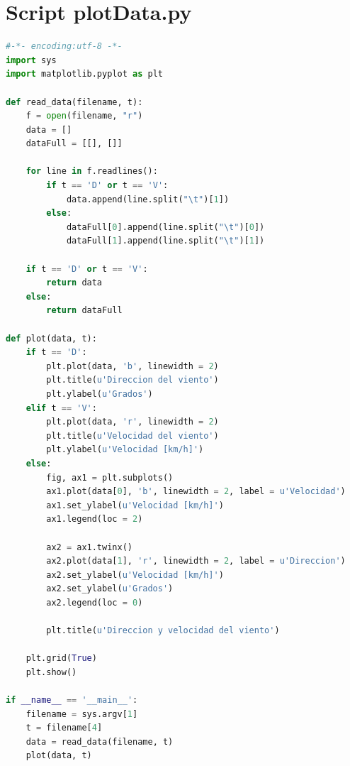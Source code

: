 \documentclass[a4paper, 11pt]{article}
\begin{document}
\section{Script plotData.py}
\label{app:script5}
\begin{lstlisting}[basicstyle=\small, language = Python]
#-*- encoding:utf-8 -*-
import sys
import matplotlib.pyplot as plt

def read_data(filename, t):
    f = open(filename, "r")
    data = []
    dataFull = [[], []]

    for line in f.readlines():
        if t == 'D' or t == 'V':
            data.append(line.split("\t")[1])
        else:
            dataFull[0].append(line.split("\t")[0])
            dataFull[1].append(line.split("\t")[1])

    if t == 'D' or t == 'V':
        return data
    else:
        return dataFull

def plot(data, t):
    if t == 'D':
        plt.plot(data, 'b', linewidth = 2)
        plt.title(u'Direccion del viento')
        plt.ylabel(u'Grados')
    elif t == 'V':
        plt.plot(data, 'r', linewidth = 2)
        plt.title(u'Velocidad del viento')
        plt.ylabel(u'Velocidad [km/h]')
    else:
        fig, ax1 = plt.subplots()
        ax1.plot(data[0], 'b', linewidth = 2, label = u'Velocidad')
        ax1.set_ylabel(u'Velocidad [km/h]')
        ax1.legend(loc = 2)

        ax2 = ax1.twinx()
        ax2.plot(data[1], 'r', linewidth = 2, label = u'Direccion')
        ax2.set_ylabel(u'Velocidad [km/h]')
        ax2.set_ylabel(u'Grados')
        ax2.legend(loc = 0)

        plt.title(u'Direccion y velocidad del viento')

    plt.grid(True)
    plt.show()

if __name__ == '__main__':
    filename = sys.argv[1]
    t = filename[4]
    data = read_data(filename, t)
    plot(data, t)
\end{lstlisting}
\end{document}
